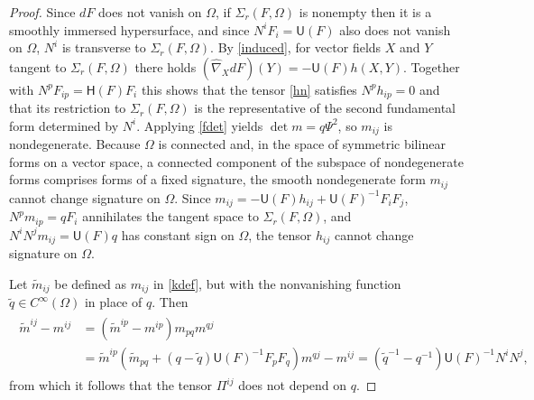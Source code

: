 \documentclass [leqno, 10pt]{amsart}
\theoremstyle{definition}
\numberwithin{equation}{section}
\newcommand{\Om}{\Omega}
\newcommand{\U}{\mathsf{U}}
\newcommand{\lc}{\Sigma}
\renewcommand{\H}{\mathsf{H}}
\newcommand{\sff}{\Pi}
\newcommand{\cinf}{C^{\infty}}
\newcommand{\hnabla}{\widehat{\nabla}}
\begin{document}
\begin{proof}
Since $dF$ does not vanish on $\Om$, if $\lc_{r}(F, \Om)$ is nonempty then it is a smoothly immersed hypersurface, and since $N^{i}F_{i} = \U(F)$ also does not vanish on $\Om$, $N^{i}$ is transverse to $\lc_{r}(F, \Om)$. By \eqref{induced}, for vector fields $X$ and $Y$ tangent to $\lc_{r}(F, \Om)$ there holds $(\hnabla_{X}dF)(Y) = -\U(F)h(X, Y)$. Together with $N^{p}F_{ip} = \H(F)F_{i}$ this shows that the tensor \eqref{hn} satisfies $N^{p}h_{ip} = 0$ and that its restriction to $\lc_{r}(F, \Om)$ is the representative of the second fundamental form determined by $N^{i}$. 
Applying \eqref{fdet} yields $\det m = q\Psi^{2}$, so $m_{ij}$ is nondegenerate. Because $\Om$ is connected and, in the space of symmetric bilinear forms on a vector space, a connected component of the subspace of nondegenerate forms comprises forms of a fixed signature, the smooth nondegenerate form $m_{ij}$ cannot change signature on $\Om$. Since $m_{ij} = -\U(F)h_{ij} + \U(F)^{-1}F_{i}F_{j}$, $N^{p}m_{ip} = qF_{i}$ annihilates the tangent space to $\lc_{r}(F, \Om)$, and $N^{i}N^{j}m_{ij} = \U(F)q$ has constant sign on $\Om$, the tensor $h_{ij}$ cannot change signature on $\Om$.

Let $\tilde{m}_{ij}$ be defined as $m_{ij}$ in \eqref{kdef}, but with the nonvanishing function $\tilde{q} \in \cinf(\Om)$ in place of $q$. Then 
\begin{align}
\begin{split}
\tilde{m}^{ij} - m^{ij} & = 
(\tilde{m}^{ip} - m^{ip})m_{pq}m^{qj} \\
&= \tilde{m}^{ip}(\tilde{m}_{pq} + (q - \tilde{q})\U(F)^{-1}F_{p}F_{q})m^{qj} - m^{ij} = (\tilde{q}^{-1} - q^{-1})\U(F)^{-1}N^{i}N^{j},
\end{split}
\end{align} 
from which it follows that the tensor $\sff^{ij}$ does not depend on $q$.


\end{proof}
\end{document}
